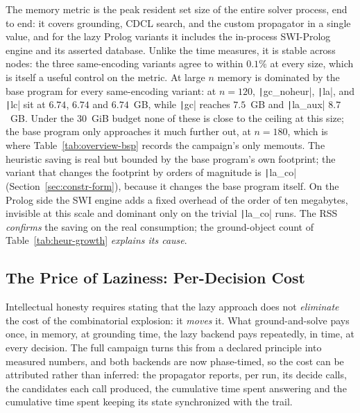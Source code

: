 The memory metric is the peak resident set size of the entire solver process, end to end: it covers grounding, CDCL search, and the custom propagator in a single value, and for the lazy Prolog variants it includes the in-process SWI-Prolog engine and its asserted database. Unlike the time measures, it is stable across nodes: the three same-encoding variants agree to within $0.1\%$ at every size, which is itself a useful control on the metric. At large $n$ memory is dominated by the base program for every same-encoding variant: at $n=120$, \texttt|gc_noheur|, \texttt|la|, and \texttt|lc| sit at $6.74$, $6.74$ and $6.74$~GB, while \texttt|gc| reaches $7.5$~GB and \texttt|la_aux| $8.7$~GB. Under the 30~GiB budget none of these is close to the ceiling at this size; the base program only approaches it much further out, at $n=180$, which is where Table~\ref{tab:overview-bsp} records the campaign's only memouts. The heuristic saving is real but bounded by the base program's own footprint; the variant that changes the footprint by orders of magnitude is \texttt|la_co| (Section~\ref{sec:constr-form}), because it changes the base program itself. On the Prolog side the SWI engine adds a fixed overhead of the order of ten megabytes, invisible at this scale and dominant only on the trivial \texttt|la_co| runs. The RSS \emph{confirms} the saving on the real consumption; the ground-object count of Table~\ref{tab:heur-growth} \emph{explains its cause}.

\subsection{The Price of Laziness: Per-Decision Cost}
\label{sec:per-decision-cost}

Intellectual honesty requires stating that the lazy approach does not \emph{eliminate} the cost of the combinatorial explosion: it \emph{moves} it. What ground-and-solve pays once, in memory, at grounding time, the lazy backend pays repeatedly, in time, at every decision. The full campaign turns this from a declared principle into measured numbers, and both backends are now phase-timed, so the cost can be attributed rather than inferred: the propagator reports, per run, its decide calls, the candidates each call produced, the cumulative time spent answering and the cumulative time spent keeping its state synchronized with the trail.

